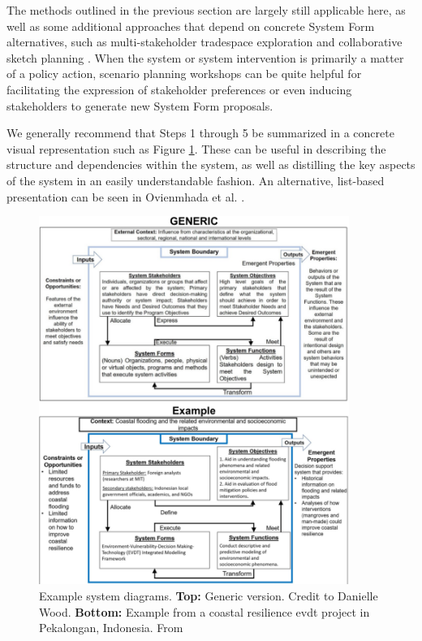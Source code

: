 The methods outlined in the previous section are largely still applicable here, as well as some additional approaches that depend on concrete System Form alternatives, such as multi-stakeholder tradespace exploration \cite{fitzgeraldRecommendationsFramingMultistakeholder2016} and collaborative sketch planning \cite{vonkSociotechnicalPSSDevelopment2010}. When the system or system intervention is primarily a matter of a policy action, scenario planning workshops can be quite helpful for facilitating the expression of stakeholder preferences or even inducing stakeholders to generate new System Form proposals.

We generally recommend that Steps 1 through 5 be summarized in a concrete visual representation such as Figure \ref{fig:system-diagram}. These can be useful in describing the structure and dependencies within the system, as well as distilling the key aspects of the system in an easily understandable fashion. An alternative, list-based presentation can be seen in Ovienmhada et al. \cite{ovienmhadaInclusiveDesignEarth2021}.

\clearpage

\begin{figure}[!htb] 
\centering
\includegraphics[width=0.9\textwidth]{Figures/chap3/system-diagram-combined.png}
\caption[Example system diagrams]{Example system diagrams. \textbf{Top:} Generic version. Credit to Danielle Wood. \textbf{Bottom:} Example from a coastal resilience \ac{evdt} project in Pekalongan, Indonesia. From \cite{lombardoEnvironmentVulnerabilityDecisionTechnologyFrameworkDecision2022}}
\label{fig:system-diagram}
\end{figure}

